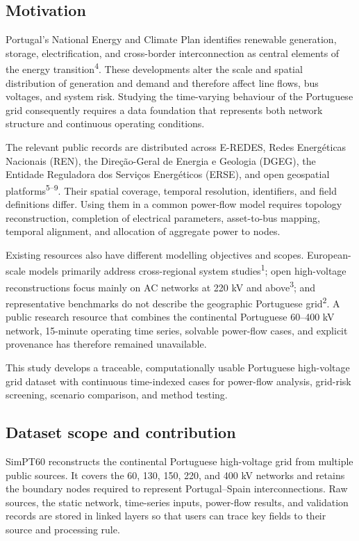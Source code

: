 \documentclass[
  10pt]{article}
\begin{document}
\subsection{Motivation}\label{motivation}

Portugal's National Energy and Climate Plan identifies renewable
generation, storage, electrification, and cross-border interconnection
as central elements of the energy transition\textsuperscript{4}. These
developments alter the scale and spatial distribution of generation and
demand and therefore affect line flows, bus voltages, and system risk.
Studying the time-varying behaviour of the Portuguese grid consequently
requires a data foundation that represents both network structure and
continuous operating conditions.

The relevant public records are distributed across E-REDES, Redes
Energéticas Nacionais (REN), the Direção-Geral de Energia e Geologia
(DGEG), the Entidade Reguladora dos Serviços Energéticos (ERSE), and
open geospatial platforms\textsuperscript{5--9}. Their spatial coverage,
temporal resolution, identifiers, and field definitions differ. Using
them in a common power-flow model requires topology reconstruction,
completion of electrical parameters, asset-to-bus mapping, temporal
alignment, and allocation of aggregate power to nodes.

Existing resources also have different modelling objectives and scopes.
European-scale models primarily address cross-regional system
studies\textsuperscript{1}; open high-voltage reconstructions focus
mainly on AC networks at 220 kV and above\textsuperscript{3}; and
representative benchmarks do not describe the geographic Portuguese
grid\textsuperscript{2}. A public research resource that combines the
continental Portuguese 60--400 kV network, 15-minute operating time
series, solvable power-flow cases, and explicit provenance has therefore
remained unavailable.

This study develops a traceable, computationally usable Portuguese
high-voltage grid dataset with continuous time-indexed cases for
power-flow analysis, grid-risk screening, scenario comparison, and
method testing.

\subsection{Dataset scope and
contribution}\label{dataset-scope-and-contribution}

SimPT60 reconstructs the continental Portuguese high-voltage grid from
multiple public sources. It covers the 60, 130, 150, 220, and 400 kV
networks and retains the boundary nodes required to represent
Portugal--Spain interconnections. Raw sources, the static network,
time-series inputs, power-flow results, and validation records are
stored in linked layers so that users can trace key fields to their
source and processing rule.
\end{document}

